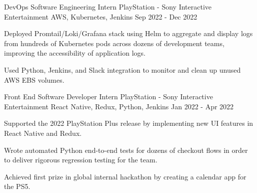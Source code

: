 

\begin{cventries}

  \cventry
    {DevOps Software Engineering Intern} %
    {PlayStation - Sony Interactive Entertainment} %
    {AWS, Kubernetes, Jenkins} %
    {Sep 2022 - Dec 2022} %
    {
      \begin{cvitems} %
        \item {Deployed Promtail/Loki/Grafana stack using Helm to aggregate and display logs from hundreds of Kubernetes pods across dozens of development teams, improving the accessibility of application logs.}
        \item {Used Python, Jenkins, and Slack integration to monitor and clean up unused AWS EBS volumes.}
      \end{cvitems}
    }

  \cventry
    {Front End Software Developer Intern} %
    {PlayStation - Sony Interactive Entertainment} %
    {React Native, Redux, Python, Jenkins} %
    {Jan 2022 - Apr 2022} %
    {
      \begin{cvitems} %
        \item {Supported the 2022 PlayStation Plus release by implementing new UI features in React Native and Redux.}
        \item {Wrote automated Python end-to-end tests for dozens of checkout flows in order to deliver rigorous regression testing for the team.} 
        \item {Achieved first prize in global internal hackathon by creating a calendar app for the PS5.}
      \end{cvitems}
    }



\end{cventries}
